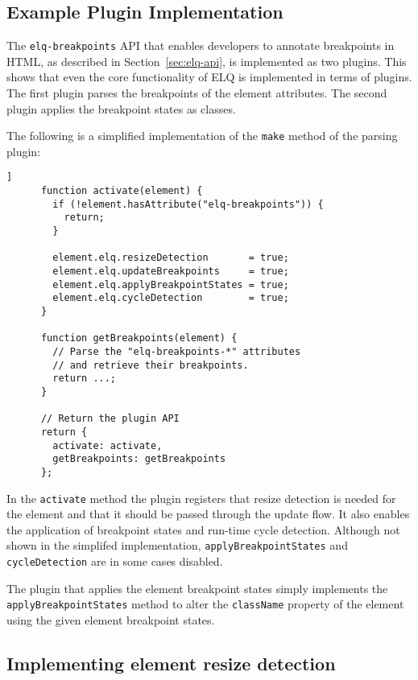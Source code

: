 \documentclass{llncs}
\newcommand{\code}[1]{\texttt{#1}}
\newcommand{\elq}{ELQ}
\begin{document}
  \subsection{Example Plugin Implementation}
    The \code{elq-breakpoints} API that enables developers to annotate breakpoints in HTML, as described in Section~\ref{sec:elq-api}, is implemented as two plugins.
    This shows that even the core functionality of \elq{} is implemented in terms of plugins.
    The first plugin parses the breakpoints of the element attributes.
    The second plugin applies the breakpoint states as classes.

    The following is a simplified implementation of the \code{make} method of the parsing plugin:

    \begin{lstlisting}[gobble=6,caption={},captionpos=b,label={}]]
      function activate(element) {
        if (!element.hasAttribute("elq-breakpoints")) {
          return;
        }

        element.elq.resizeDetection       = true;
        element.elq.updateBreakpoints     = true;
        element.elq.applyBreakpointStates = true;
        element.elq.cycleDetection        = true;
      }

      function getBreakpoints(element) {
        // Parse the "elq-breakpoints-*" attributes
        // and retrieve their breakpoints.
        return ...;
      }

      // Return the plugin API
      return {
        activate: activate,
        getBreakpoints: getBreakpoints
      };
    \end{lstlisting}

    \noindent
    In the \code{activate} method the plugin registers that resize detection is needed for the element and that it should be passed through the update flow.
    It also enables the application of breakpoint states and run-time cycle detection.
    Although not shown in the simplifed implementation, \code{applyBreakpointStates} and \code{cycleDetection} are in some cases disabled.

    The plugin that applies the element breakpoint states simply implements the \code{applyBreakpointStates} method to alter the \code{className} property of the element using the given element breakpoint states.

  \subsection{Implementing element resize detection}\label{sec:imp_erd}
\end{document}
